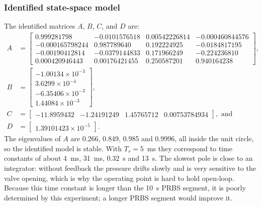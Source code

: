 \documentclass[12pt,a4paper]{article}
\begin{document}
\subsubsection{Identified state-space model}
The identified matrices $A$, $B$, $C$, and $D$ are:
\begin{equation}
\begin{aligned}
A &= \begin{bmatrix}
 0.999281798 & -0.0101576518 &  0.00542226814 & -0.000460844576 \\
-0.000165798244 &  0.987789640 &  0.192224925 & -0.0184817195 \\
-0.00190412814 & -0.0379144833 &  0.171966249 & -0.224236810 \\
 0.000420946443 &  0.00176421455 &  0.250587201 &  0.940164238
\end{bmatrix}, \\[4pt]
B &= \begin{bmatrix}
-1.00134 \times 10^{-3} \\
 3.6299 \times 10^{-4} \\
-6.35406 \times 10^{-3} \\
 1.44084 \times 10^{-3}
\end{bmatrix}, \\[4pt]
C &= \begin{bmatrix}
-11.8959432 & -1.24191249 & 1.45765712 & 0.00753784934
\end{bmatrix}, \text{ and}\\[4pt]
D &= \begin{bmatrix} 1.39101423 \times 10^{-5} \end{bmatrix}.
\end{aligned}
\label{eq:identified_model}
\end{equation}
The eigenvalues of $A$ are 0.266, 0.849, 0.985 and 0.9996, all inside the unit circle, so the identified model is stable. With $T_s = 5$~ms they correspond to time constants of about 4~ms, 31~ms, 0.32~s and 13~s. The slowest pole is close to an integrator: without feedback the pressure drifts slowly and is very sensitive to the valve opening, which is why the operating point is hard to hold open-loop. Because this time constant is longer than the 10~s PRBS segment, it is poorly determined by this experiment; a longer PRBS segment would improve it.
\end{document}
